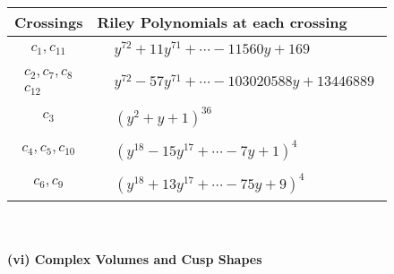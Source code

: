 \documentclass[1p]{elsarticle_modified}
\theoremstyle{definition}
\begin{document}
\begin{tabular}{m{50pt}|m{274pt}}
Crossings & \hspace{64pt}Riley Polynomials at each crossing \\
\hline $$\begin{aligned}c_{1},c_{11}\end{aligned}$$&$\begin{aligned}
&y^{72}+11 y^{71}+\cdots-11560 y+169
\end{aligned}$\\
\hline $$\begin{aligned}c_{2},c_{7},c_{8}\\c_{12}\end{aligned}$$&$\begin{aligned}
&y^{72}-57 y^{71}+\cdots-103020588 y+13446889
\end{aligned}$\\
\hline $$\begin{aligned}c_{3}\end{aligned}$$&$\begin{aligned}
&(y^2+y+1)^{36}
\end{aligned}$\\
\hline $$\begin{aligned}c_{4},c_{5},c_{10}\end{aligned}$$&$\begin{aligned}
&(y^{18}-15 y^{17}+\cdots-7 y+1)^{4}
\end{aligned}$\\
\hline $$\begin{aligned}c_{6},c_{9}\end{aligned}$$&$\begin{aligned}
&(y^{18}+13 y^{17}+\cdots-75 y+9)^{4}
\end{aligned}$\\
\hline
\end{tabular}\\~\\
\newpage\flushleft \textbf{(vi) Complex Volumes and Cusp Shapes}
\end{document}
